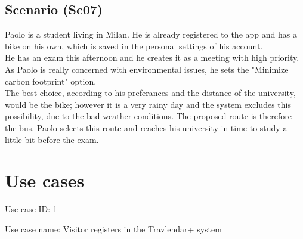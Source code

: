 \documentclass[a4paper,leqno]{book}
\begin{document}
\subsection{Scenario (Sc07)}
Paolo is a student living in Milan. He is already registered to the app and has a bike on his own, which is saved in the personal settings of his account.\\
He has an exam this afternoon and he creates it as a meeting with high priority. As Paolo is really concerned with environmental issues, he sets the "Minimize carbon footprint" option.\\
The best choice, according to his preferances and the distance of the university, would be the bike; however it is a very rainy day and the system excludes this possibility, due to the bad weather conditions.
The proposed route is therefore the bus. Paolo selects this route and reaches his university in time to study a little bit before the exam.

\newpage
\section{Use cases}

Use case ID: 1

Use case name: Visitor registers in the Travlendar+ system
\end{document}
